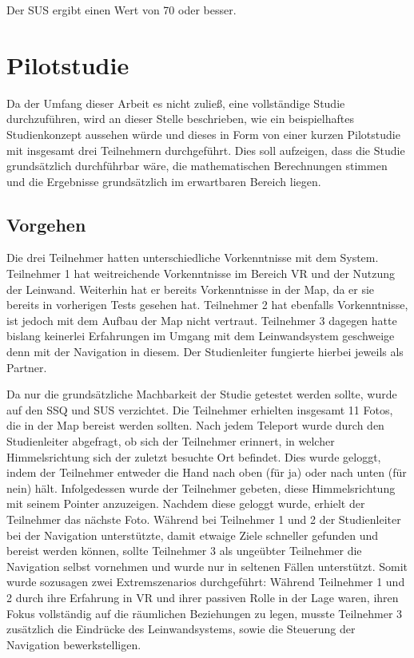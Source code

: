 \begin{hypothesis}
\label{hyp:test}
Der SUS ergibt einen Wert von 70 oder besser.
\end{hypothesis}


\section{Pilotstudie}

Da der Umfang dieser Arbeit es nicht zuließ, eine vollständige Studie durchzuführen, wird an dieser Stelle beschrieben, wie ein beispielhaftes Studienkonzept aussehen würde und dieses in Form von einer kurzen Pilotstudie mit insgesamt drei Teilnehmern durchgeführt. Dies soll aufzeigen, dass die Studie grundsätzlich durchführbar wäre, die mathematischen Berechnungen stimmen und die Ergebnisse grundsätzlich im erwartbaren Bereich liegen.

\subsection{Vorgehen}
Die drei Teilnehmer hatten unterschiedliche Vorkenntnisse mit dem System. Teilnehmer 1 hat weitreichende Vorkenntnisse im Bereich VR und der Nutzung der Leinwand. Weiterhin hat er bereits Vorkenntnisse in der Map, da er sie bereits in vorherigen Tests gesehen hat. Teilnehmer 2 hat ebenfalls Vorkenntnisse, ist jedoch mit dem Aufbau der Map nicht vertraut. Teilnehmer 3 dagegen hatte bislang keinerlei Erfahrungen im Umgang mit dem Leinwandsystem geschweige denn mit der Navigation in diesem. Der Studienleiter fungierte hierbei jeweils als Partner.

Da nur die grundsätzliche Machbarkeit der Studie getestet werden sollte, wurde auf den SSQ und SUS verzichtet. Die Teilnehmer erhielten insgesamt 11 Fotos, die in der Map bereist werden sollten. Nach jedem Teleport wurde durch den Studienleiter abgefragt, ob sich der Teilnehmer erinnert, in welcher Himmelsrichtung sich der zuletzt besuchte Ort befindet. Dies wurde geloggt, indem der Teilnehmer entweder die Hand nach oben (für ja) oder nach unten (für nein) hält.
Infolgedessen wurde der Teilnehmer gebeten, diese Himmelsrichtung mit seinem Pointer anzuzeigen. Nachdem diese geloggt wurde, erhielt der Teilnehmer das nächste Foto. Während bei Teilnehmer 1 und 2 der Studienleiter bei der Navigation unterstützte, damit etwaige Ziele schneller gefunden und bereist werden können, sollte Teilnehmer 3 als ungeübter Teilnehmer die Navigation selbst vornehmen und wurde nur in seltenen Fällen unterstützt.
Somit wurde sozusagen zwei Extremszenarios durchgeführt: Während Teilnehmer 1 und 2 durch ihre Erfahrung in VR und ihrer passiven Rolle in der Lage waren, ihren Fokus vollständig auf die räumlichen Beziehungen zu legen, musste Teilnehmer 3 zusätzlich die Eindrücke des Leinwandsystems, sowie die Steuerung der Navigation bewerkstelligen.

